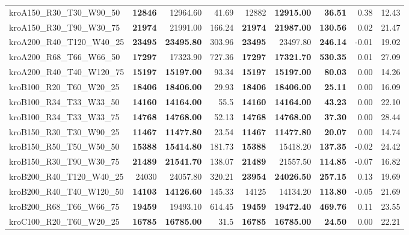 \documentclass{singlecol-new}
\begin{document}
{\begin{longtable}{lrrrrrrrr}
		kroA150\_R30\_T30\_W90\_50 & \textbf{12846} & 12964.60 & 41.69 & 12882 & \textbf{12915.00} & \textbf{36.51} & 0.38 & 12.43 \\
		kroA150\_R30\_T90\_W30\_75 & \textbf{21974} & 21991.00 & 166.24 & \textbf{21974} & \textbf{21987.00} & \textbf{130.56} & 0.02 & 21.47 \\
		kroA200\_R40\_T120\_W40\_25 & \textbf{23495} & \textbf{23495.80} & 303.96 & \textbf{23495} & 23497.80 & \textbf{246.14} & -0.01 & 19.02 \\
		kroA200\_R68\_T66\_W66\_50 & \textbf{17297} & 17323.90 & 727.36 & \textbf{17297} & \textbf{17321.70} & \textbf{530.35} & 0.01 & 27.09 \\
		kroA200\_R40\_T40\_W120\_75 & \textbf{15197} & \textbf{15197.00} & 93.34 & \textbf{15197} & \textbf{15197.00} & \textbf{80.03} & 0.00 & 14.26 \\
		kroB100\_R20\_T60\_W20\_25 & \textbf{18406} & \textbf{18406.00} & 29.93 & \textbf{18406} & \textbf{18406.00} & \textbf{25.11} & 0.00 & 16.09 \\
		kroB100\_R34\_T33\_W33\_50 & \textbf{14160} & \textbf{14164.00} & 55.5 & \textbf{14160} & \textbf{14164.00} & \textbf{43.23} & 0.00 & 22.10 \\
		kroB100\_R34\_T33\_W33\_75 & \textbf{14768} & \textbf{14768.00} & 52.13 & \textbf{14768} & \textbf{14768.00} & \textbf{37.30} & 0.00 & 28.44 \\
		kroB150\_R30\_T30\_W90\_25 & \textbf{11467} & \textbf{11477.80} & 23.54 & \textbf{11467} & \textbf{11477.80} & \textbf{20.07} & 0.00 & 14.74 \\
		kroB150\_R50\_T50\_W50\_50 & \textbf{15388} & \textbf{15414.80} & 181.73 & \textbf{15388} & 15418.20 & \textbf{137.35} & -0.02 & 24.42 \\
		kroB150\_R30\_T90\_W30\_75 & \textbf{21489} & \textbf{21541.70} & 138.07 & \textbf{21489} & 21557.50 & \textbf{114.85} & -0.07 & 16.82 \\
		kroB200\_R40\_T120\_W40\_25 & 24030 & 24057.80 & 320.21 & \textbf{23954} & \textbf{24026.50} & \textbf{257.15} & 0.13 & 19.69 \\
		kroB200\_R40\_T40\_W120\_50 & \textbf{14103} & \textbf{14126.60} & 145.33 & 14125 & 14134.20 & \textbf{113.80} & -0.05 & 21.69 \\
		kroB200\_R68\_T66\_W66\_75 & \textbf{19459} & 19493.10 & 614.45 & \textbf{19459} & \textbf{19472.40} & \textbf{469.76} & 0.11 & 23.55 \\
		kroC100\_R20\_T60\_W20\_25 & \textbf{16785} & \textbf{16785.00} & 31.5 & \textbf{16785} & \textbf{16785.00} & \textbf{24.50} & 0.00 & 22.21 \\

\end{longtable}}
\end{document}
